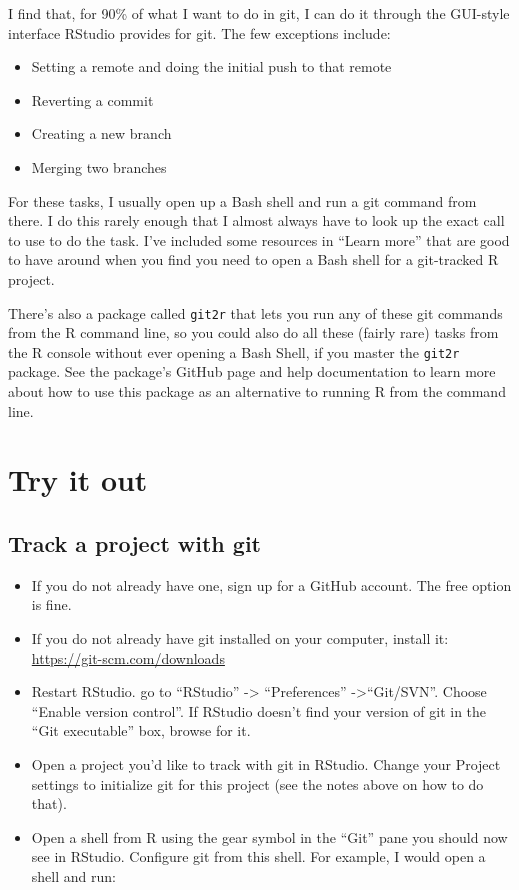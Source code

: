 \documentclass[]{tufte-book}
\providecommand{\tightlist}{%
  \setlength{\itemsep}{0pt}\setlength{\parskip}{0pt}}
\begin{document}
I find that, for 90\% of what I want to do in git, I can do it through the GUI-style
interface RStudio provides for git. The few exceptions include:

\begin{itemize}
\tightlist
\item
  Setting a remote and doing the initial push to that remote
\item
  Reverting a commit
\item
  Creating a new branch
\item
  Merging two branches
\end{itemize}

For these tasks, I usually open up a Bash shell and run a git command from
there. I do this rarely enough that I almost always have to look up the exact
call to use to do the task. I've included some resources in ``Learn more'' that
are good to have around when you find you need to open a Bash shell for a
git-tracked R project.

There's also a package called \texttt{git2r} that lets you run any of these git
commands from the R command line, so you could also do all these (fairly rare)
tasks from the R console without ever opening a Bash Shell, if you master the
\texttt{git2r} package. See the package's GitHub page and help documentation
to learn more about how to use this package as an alternative to running R from
the command line.

\hypertarget{try-it-out}{%
\section{Try it out}\label{try-it-out}}

\hypertarget{track-a-project-with-git}{%
\subsection{Track a project with git}\label{track-a-project-with-git}}

\begin{itemize}
\tightlist
\item
  If you do not already have one, sign up for a GitHub account. The free option
  is fine.
\item
  If you do not already have git installed on your computer, install it:
  \url{https://git-scm.com/downloads}
\item
  Restart RStudio. go to ``RStudio'' -\textgreater{} ``Preferences'' -\textgreater{}``Git/SVN''. Choose ``Enable
  version control''. If RStudio doesn't find your version of git in the ``Git
  executable'' box, browse for it.
\item
  Open a project you'd like to track with git in RStudio. Change your Project
  settings to initialize git for this project (see the notes above on how to do
  that).
\item
  Open a shell from R using the gear symbol in the ``Git'' pane you should now see
  in RStudio. Configure git from this shell. For example, I would open a shell and run:
\end{itemize}
\end{document}
